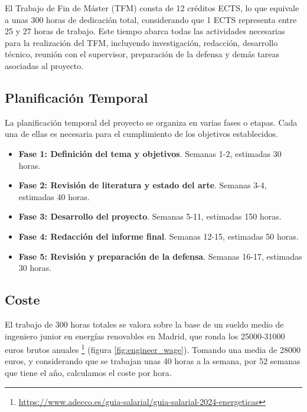 El Trabajo de Fin de Máster (TFM) consta de 12 créditos ECTS, lo que equivale a
unas 300 horas de dedicación total, considerando que 1 ECTS representa entre 25
y 27 horas de trabajo. Este tiempo abarca todas las actividades necesarias para
la realización del TFM, incluyendo investigación, redacción, desarrollo
técnico, reunión con el supervisor, preparación de la defensa y demás tareas
asociadas al proyecto.

\subsection{Planificación Temporal}

La planificación temporal del proyecto se organiza en varias fases o etapas.
Cada una de ellas es necesaria para el cumplimiento de los objetivos
establecidos.

\begin{itemize}

	\item \textbf{Fase 1: Definición del tema y objetivos}.
	      Semanas 1-2, estimadas 30 horas.

	\item \textbf{Fase 2: Revisión de literatura y estado del arte}.
	      Semanas 3-4, estimadas 40 horas.

	\item \textbf{Fase 3: Desarrollo del proyecto}.
	      Semanas 5-11, estimadas 150 horas.

	\item \textbf{Fase 4: Redacción del informe final}.
	      Semanas 12-15, estimadas 50 horas.

	\item \textbf{Fase 5: Revisión y preparación de la defensa}.
	      Semanas 16-17, estimadas 30 horas.

\end{itemize}

\subsection{Coste}

El trabajo de 300 horas totales se valora sobre la base de un sueldo medio de
ingeniero junior en energías renovables en Madrid, que ronda los 25000-31000
euros brutos anuales
\footnote{\url{https://www.adecco.es/guia-salarial/guia-salarial-2024-energeticas}}
(figura \ref{fig:engineer_wage}). Tomando una media de 28000 euros, y
considerando que se trabajan unas 40 horas a la semana, por 52 semanas que
tiene el año, calculamos el coste por hora.

